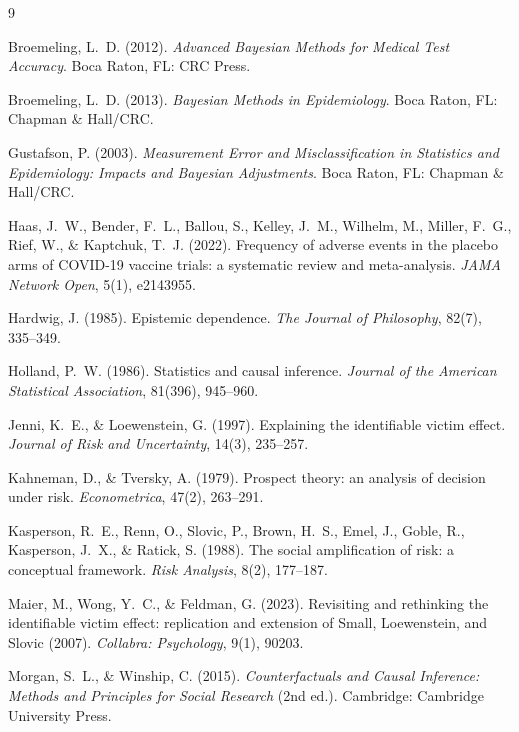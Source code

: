 \documentclass[11pt]{article}
\begin{document}

\begin{thebibliography}{9}

Broemeling, L.~D. (2012). \textit{Advanced Bayesian Methods for Medical Test Accuracy}. Boca Raton, FL: CRC Press.

Broemeling, L.~D. (2013). \textit{Bayesian Methods in Epidemiology}. Boca Raton, FL: Chapman \& Hall/CRC.

Gustafson, P. (2003). \textit{Measurement Error and Misclassification in Statistics and Epidemiology: Impacts and Bayesian Adjustments}. Boca Raton, FL: Chapman \& Hall/CRC.

Haas, J.~W., Bender, F.~L., Ballou, S., Kelley, J.~M., Wilhelm, M., Miller, F.~G., Rief, W., \& Kaptchuk, T.~J. (2022). Frequency of adverse events in the placebo arms of COVID-19 vaccine trials: a systematic review and meta-analysis. \textit{JAMA Network Open}, 5(1), e2143955.

Hardwig, J. (1985). Epistemic dependence. \textit{The Journal of Philosophy}, 82(7), 335--349.

Holland, P.~W. (1986). Statistics and causal inference. \textit{Journal of the American Statistical Association}, 81(396), 945--960.

Jenni, K.~E., \& Loewenstein, G. (1997). Explaining the identifiable victim effect. \textit{Journal of Risk and Uncertainty}, 14(3), 235--257.

Kahneman, D., \& Tversky, A. (1979). Prospect theory: an analysis of decision under risk. \textit{Econometrica}, 47(2), 263--291.

Kasperson, R.~E., Renn, O., Slovic, P., Brown, H.~S., Emel, J., Goble, R., Kasperson, J.~X., \& Ratick, S. (1988). The social amplification of risk: a conceptual framework. \textit{Risk Analysis}, 8(2), 177--187.

Maier, M., Wong, Y.~C., \& Feldman, G. (2023). Revisiting and rethinking the identifiable victim effect: replication and extension of Small, Loewenstein, and Slovic (2007). \textit{Collabra: Psychology}, 9(1), 90203.

Morgan, S.~L., \& Winship, C. (2015). \textit{Counterfactuals and Causal Inference: Methods and Principles for Social Research} (2nd ed.). Cambridge: Cambridge University Press.


\end{thebibliography}
\end{document}

